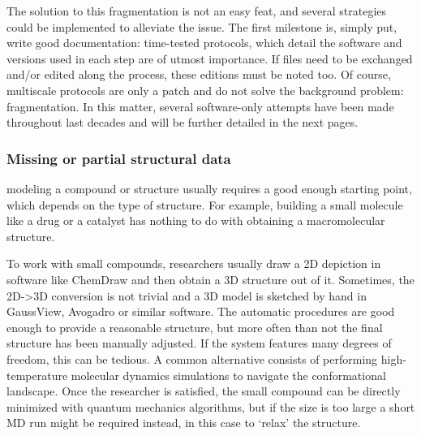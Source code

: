 
The solution to this fragmentation is not an easy feat, and several strategies could be implemented to alleviate the issue. The first milestone is, simply put, write good documentation: time-tested protocols, which detail the software and versions used in each step are of utmost importance. If files need to be exchanged and/or edited along the process, these editions must be noted too. Of course, multiscale protocols are only a patch and do not solve the background problem: fragmentation. In this matter, several software-only attempts have been made throughout last decades and will be further detailed in the next pages.

\subsubsection{Missing or partial structural data}
modeling a compound or structure usually requires a good enough starting point, which depends on the type of structure. For example, building a small molecule like a drug or a catalyst has nothing to do with obtaining a macromolecular structure.

To work with small compounds, researchers usually draw a 2D depiction in software like ChemDraw\cite{chemdraw} and then obtain a 3D structure out of it. Sometimes, the 2D->3D conversion is not trivial and a 3D model is sketched by hand in GaussView,\cite{gaussview} Avogadro\cite{avogadro} or similar software. The automatic procedures are good enough to provide a reasonable structure, but more often than not the final structure has been manually adjusted. If the system features many degrees of freedom, this can be tedious. A common alternative consists of performing high-temperature molecular dynamics simulations to navigate the conformational landscape. Once the researcher is satisfied, the small compound can be directly minimized with quantum mechanics algorithms, but if the size is too large a short MD run might be required instead, in this case to ‘relax’ the structure.

